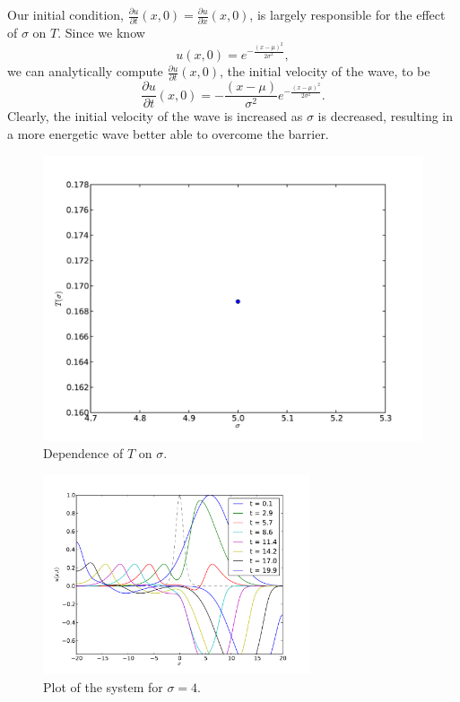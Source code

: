 \documentclass[10pt]{article}
\begin{document}
Our initial condition, $\frac{\partial u}{\partial t}(x,0) = \frac{\partial u}{\partial x} (x,0)$,
is largely responsible for the effect of $\sigma$ on $T$. Since we know
$$ u(x,0) = e^{-\frac{(x-\mu)^2}{2\sigma^2}},$$
we can analytically compute $\frac{\partial u}{\partial t}(x,0)$, the initial velocity
of the wave, to be
$$ \frac{\partial u}{\partial t}(x,0) = -\frac{(x-\mu)}{\sigma^2}e^{-\frac{(x-\mu)^2}{2\sigma^2}}. $$
Clearly, the initial velocity of the wave is increased as $\sigma$ is decreased, resulting in
a more energetic wave better able to overcome the barrier.

\begin{figure}
  \centering
  \includegraphics[width=\textwidth]{2/sigma.pdf}
  \caption{Dependence of $T$ on $\sigma$.}
  \label{f:sigma}
\end{figure}

\begin{figure}
  \centering
  \includegraphics[width=0.7\textwidth]{2/bigsig.pdf}
  \caption{Plot of the system for $\sigma=4$.}
  \label{f:bigsig}
\end{figure}
\end{document}
